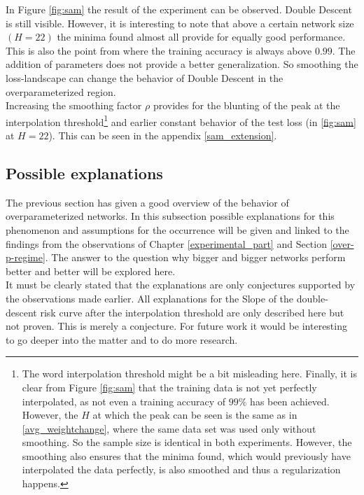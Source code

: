 In Figure \ref{fig:sam} the result of the experiment can be observed. Double Descent is still visible. However, it is interesting to note that above a certain network size $(H = 22)$ the minima found almost all provide for equally good performance. This is also the point from where the training accuracy is always above $0.99$. The addition of parameters does not provide a better generalization. So smoothing the loss-landscape can change the behavior of Double Descent in the overparameterized region. \\
Increasing the smoothing factor $\rho$ provides for the blunting of the peak at the interpolation threshold\footnote{The word interpolation threshold might be a bit misleading here. Finally, it is clear from Figure \ref{fig:sam} that the training data is not yet perfectly interpolated, as not even a training accuracy of $99\%$ has been achieved. However, the $H$ at which the peak can be seen is the same as in \ref{avg_weightchange}, where the same data set was used only without smoothing. So the sample size is identical in both experiments. However, the smoothing also ensures that the minima found, which would previously have interpolated the data perfectly, is also smoothed and thus a regularization happens.}
and earlier constant behavior of the test loss (in \ref{fig:sam} at $H=22$). This can be seen in the appendix \ref{sam_extension}. 




\newpage
\subsection{Possible explanations} 
    \label{possible_explanations}
    
    
The previous section has given a good overview of the behavior of overparameterized networks. In this subsection possible explanations for this phenomenon and assumptions for the occurrence will be given and linked to the findings from the observations of Chapter \ref{experimental_part} and Section \ref{over-p-regime}. The answer to the question why bigger and bigger networks perform better and better will be explored here. \\
It must be clearly stated that the explanations are only conjectures supported by the observations made earlier. All explanations for the Slope of the double-descent risk curve after the interpolation threshold are only described here but not proven. This is merely a conjecture. For future work it would be interesting to go deeper into the matter and to do more research.  \\


